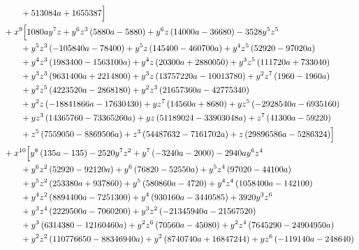 \begin{align*}
&\qquad + 513084 a + 1655387\Bigr]\\
&{}+x^{9}\Bigl[1080 a y^{7} z + y^{6} z^{3} \left(5880 a - 5880\right) + y^{6} z \left(14000 a - 36680\right) - 3528 y^{5} z^{5}\\
&\qquad + y^{5} z^{3} \left(- 105840 a - 78400\right) + y^{5} z \left(145400 - 460700 a\right) + y^{4} z^{5} \left(52920 - 97020 a\right)\\
&\qquad + y^{4} z^{3} \left(1983400 - 1563100 a\right) + y^{4} z \left(20300 a + 2880050\right) + y^{3} z^{5} \left(111720 a + 733040\right)\\
&\qquad + y^{3} z^{3} \left(9631400 a + 2214800\right) + y^{3} z \left(13757220 a - 10013780\right) + y^{2} z^{7} \left(1960 - 1960 a\right)\\
&\qquad + y^{2} z^{5} \left(4223520 a - 2868180\right) + y^{2} z^{3} \left(21657360 a - 42775340\right)\\
&\qquad + y^{2} z \left(- 18841866 a - 17630430\right) + y z^{7} \left(14560 a + 8680\right) + y z^{5} \left(- 2928540 a - 6935160\right)\\
&\qquad + y z^{3} \left(14365760 - 73365260 a\right) + y z \left(51189024 - 33903048 a\right) + z^{7} \left(41300 a - 59220\right)\\
&\qquad + z^{5} \left(7559050 - 8869506 a\right) + z^{3} \left(54487632 - 7161702 a\right) + z \left(29896586 a - 5286324\right)\Bigr]\\
&{}+x^{10}\Bigl[y^{8} \left(135 a - 135\right) - 2520 y^{7} z^{2} + y^{7} \left(- 3240 a - 2000\right) - 2940 a y^{6} z^{4}\\
&\qquad + y^{6} z^{2} \left(52920 - 92120 a\right) + y^{6} \left(76820 - 52550 a\right) + y^{5} z^{4} \left(97020 - 44100 a\right)\\
&\qquad + y^{5} z^{2} \left(253380 a + 937860\right) + y^{5} \left(580860 a - 4720\right) + y^{4} z^{4} \left(1058400 a - 142100\right)\\
&\qquad + y^{4} z^{2} \left(8894400 a - 7251300\right) + y^{4} \left(930160 a - 3440585\right) + 3920 y^{3} z^{6}\\
&\qquad + y^{3} z^{4} \left(2229500 a - 7060200\right) + y^{3} z^{2} \left(- 21345940 a - 21567520\right)\\
&\qquad + y^{3} \left(6314380 - 12160460 a\right) + y^{2} z^{6} \left(70560 a - 45080\right) + y^{2} z^{4} \left(7645290 - 24904950 a\right)\\
&\qquad + y^{2} z^{2} \left(110776650 - 88346940 a\right) + y^{2} \left(8740740 a + 16847244\right) + y z^{6} \left(- 119140 a - 248640\right)\\

\end{align*}

